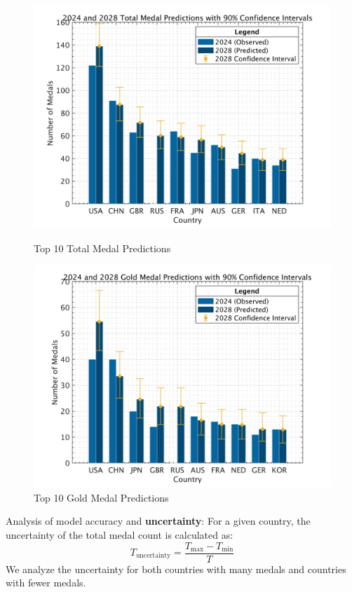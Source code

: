 \documentclass{mcmthesis}  %
\begin{document}
\begin{figure}[H]
    \centering
    \begin{minipage}{0.45\textwidth}
        \centering
        \includegraphics[width=\linewidth]{image/total_medal_predict.png}
        \caption{Top 10 Total Medal Predictions}
    \end{minipage}\hfill
    \begin{minipage}{0.45\textwidth}
        \centering
        \includegraphics[width=\linewidth]{image/gold_medal_predict.png}
        \caption{Top 10 Gold Medal Predictions}
    \end{minipage}
\end{figure}

Analysis of model accuracy and \textbf{uncertainty}:
For a given country, the uncertainty of the total medal count is calculated as:
\[
T_{\text{uncertainty}} = \frac{T_{\text{max}} - T_{\text{min}}}{T}
\]
We analyze the uncertainty for both countries with many medals and countries with fewer medals.
\end{document}
